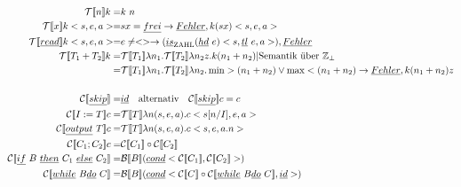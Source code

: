 \begin{align*}
\mathcal{T}[\![ n ]\!] k = & k \ n\\
\mathcal{T}[\![ x ]\!] k <s,e,a> = & sx = \underline{frei} \rightarrow \underline{Fehler}, k(sx)<s,e,a>\\
\mathcal{T}[\![ \underline{read} ]\!] k <s,e,a> = & e \neq <> \rightarrow (\underline{is}_{\text{\lstinline!ZAHL!}} (\underline{hd}\ e) <s, \underline{tl}\ e, a>), \underline{Fehler}\\
\mathcal{T}[\![ T_1 + T_2 ]\!] k = & \mathcal{T}[\![ T_1 ]\!] \lambda n_1. \mathcal{T}[\![ T_2 ]\!] \lambda	n_2 z.k(n_1 + n_2) | \text{Semantik über } \mathbb{Z}_\perp\\
= & \mathcal{T}[\![ T_1 ]\!] \lambda n_1. \mathcal{T}[\![ T_2 ]\!] \lambda	n_2 . \min > (n_1 + n_2) \lor \max < (n_1 + n_2) \rightarrow \underline{Fehler}, k (n_1+n_2) z\\
\\
\mathcal{C}[\![ \underline{skip} ]\!] = & \underline{id} \quad \text{alternativ} \quad \mathcal{C}[\![ \underline{skip} ]\!] c = c\\
\mathcal{C}[\![ I:=T ]\!] c = &\mathcal{T}[\![ T ]\!] \lambda n(s,e,a).c<s[n/I],e,a>\\
\mathcal{C}[\![ \underline{output}\ T ]\!] c = & \mathcal{T}[\![ T ]\!] \lambda n(s,e,a).c<s,e,a.n>\\
\mathcal{C}[\![ C_1;C_2 ]\!] c = & \mathcal{C}[\![ C_1 ]\!] \circ \mathcal{C}[\![ C_2 ]\!]\\
\mathcal{C}[\![ \underline{if}\ B \ \underline{then} \ C_1 \ \underline{else} \ C_2 ]\!]  = & \mathcal{B}[\![ B ]\!] (\underline{cond}<\mathcal{C}[\![ C_1 ]\!],\mathcal{C}[\![ C_2 ]\!]  >)\\
\mathcal{C}[\![ \underline{while}\ B \underline{do} \ C ]\!] = & \mathcal{B}[\![ B ]\!] (\underline{cond}<\mathcal{C}[\![ C ]\!] \circ \mathcal{C}[\![ \underline{while}\ B \underline{do} \ C ]\!], \underline{id}>)\\
\end{align*}
